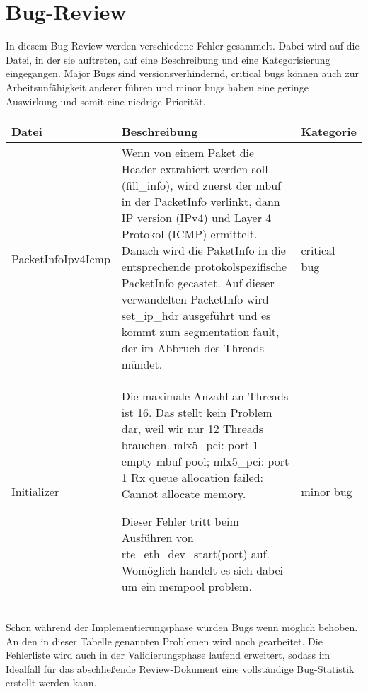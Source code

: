 \documentclass[../review_2.tex]{subfiles}
\begin{document}
    
    \chapter{Bug-Review}\thispagestyle{fancy}
    
    In diesem Bug-Review werden verschiedene Fehler gesammelt. Dabei wird auf die Datei, in der sie auftreten, auf eine Beschreibung und eine Kategorisierung eingegangen. Major Bugs sind versionsverhindernd, critical bugs können auch zur Arbeitsunfähigkeit anderer führen und minor bugs haben eine geringe Auswirkung und somit eine niedrige Priorität.
    
    \begin{longtable} [h] {p{3cm} p{8.7cm} l}
        \toprule
        \textbf{Datei} & \textbf{Beschreibung} & \textbf{Kategorie} \\ \endhead
        \midrule
        
        PacketInfoIpv4Icmp &
        Wenn von einem Paket die Header extrahiert werden soll (fill\_info), wird zuerst der mbuf in der PacketInfo verlinkt, dann IP version (IPv4) und Layer 4 Protokol (ICMP) ermittelt. Danach wird die PaketInfo in die entsprechende protokolspezifische PacketInfo gecastet. Auf dieser verwandelten PacketInfo wird set\_ip\_hdr ausgeführt und es kommt zum segmentation fault, der im Abbruch des Threads mündet. &
        critical bug \\
        
        
        Initializer &
        Die maximale Anzahl an Threads ist 16. Das stellt kein Problem dar, weil wir nur 12 Threads brauchen. mlx5\_pci: port 1 empty mbuf pool; mlx5\_pci: port 1 Rx queue allocation failed: Cannot allocate memory.
        
        Dieser Fehler tritt beim Ausführen von rte\_eth\_dev\_start(port) auf. Womöglich handelt es sich dabei um ein mempool problem.
        & minor bug \\
        
        \bottomrule
        
    \end{longtable}
    
    Schon während der Implementierungsphase wurden Bugs wenn möglich behoben. An den in dieser Tabelle genannten Problemen wird noch gearbeitet. Die Fehlerliste wird auch in der Validierungsphase laufend erweitert, sodass im Idealfall für das abschließende Review-Dokument eine vollständige Bug-Statistik erstellt werden kann.
    
\end{document}
